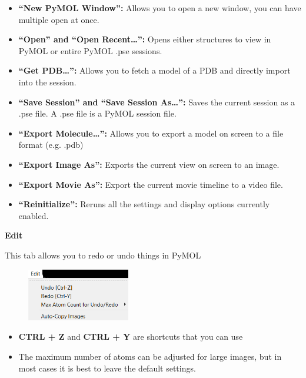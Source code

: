 \documentclass{article}
\begin{document}
\begin{itemize}
\item \textbf{“New PyMOL Window”:} Allows you to open a new window, you can have multiple open at once.

\item \textbf{“Open” and “Open Recent…”:} Opens either structures to view in PyMOL or entire PyMOL .pse sessions.

\item \textbf{“Get PDB…”:} Allows you to fetch a model of a PDB and directly import into the session.

\item \textbf{“Save Session” and “Save Session As…”:} Saves the current session as a .pse file. A .pse file is a PyMOL session file. 

\item \textbf{“Export Molecule…”:} Allows you to export a model on screen to a file format (e.g. .pdb) 

\item \textbf{“Export Image As”:} Exports the current view on screen to an image.

\item \textbf{“Export Movie As”:} Export the current movie timeline to a video file.

\item \textbf{“Reinitialize”:} Reruns all the settings and display options currently enabled.

\end{itemize}



\begin{center}
    \Large \textbf{Edit}
\end{center}

This tab allows you to redo or undo things in PyMOL \\

\begin{figure}[h!]
    \centering
    \includegraphics[width=0.4\textwidth]{workshops/pymol/imgs/edittab.png}
    \caption[]{}
    \label{edittab}
\end{figure}

\begin{itemize}
    \item \textbf{CTRL + Z} and \textbf{CTRL + Y} are shortcuts that you can use
    
    \item The maximum number of atoms can be adjusted for large images, but in most cases it is best to leave the default settings.
\end{itemize}
\end{document}
